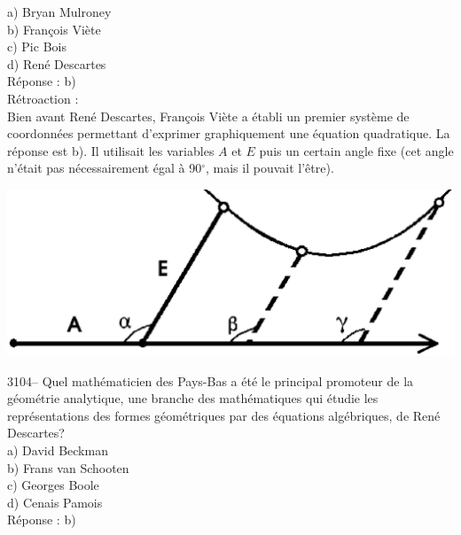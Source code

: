 \documentclass[letterpaper, 12pt]{article}
\begin{document}
a) Bryan Mulroney\\
b) Fran\c cois Vi\`ete\\
c) Pic Bois\\
d) Ren\'e Descartes\\

R\'eponse : b)\\

R\'etroaction :\\
Bien avant Ren\'e Descartes, Fran\c cois Vi\`ete a \'etabli un premier syst\`eme de coordonn\'ees permettant d'exprimer graphiquement une \'equation quadratique. La r\'eponse est b). Il utilisait les variables $A$ et $E$ puis un certain angle fixe (cet angle n'\'etait pas n\'ecessairement \'egal \`a 90$^\circ$, mais il pouvait l'\^etre).
\begin{center}
\includegraphics[scale=0.35]{etape3.eps}\\
\end{center}



3104-- Quel math\'ematicien des Pays-Bas a \'et\'e le principal promoteur de la g\'eom\'etrie analytique, une branche des math\'ematiques qui \'etudie les repr\'esentations des formes g\'eom\'etriques par des \'equations alg\'ebriques, de Ren\'e Descartes?\\

a) David Beckman\\
b) Frans van Schooten\\
c) Georges Boole\\
d) Cenais Pamois\\

R\'eponse : b)\\
\end{document}
